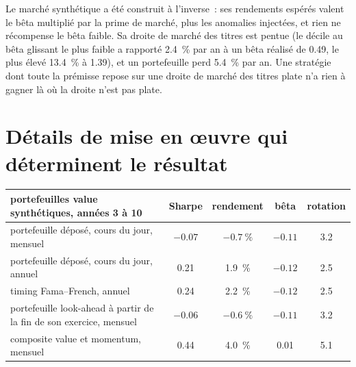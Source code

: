 Le marché synthétique a été construit à l'inverse~: ses rendements espérés valent le bêta multiplié par la prime de marché, plus les anomalies injectées, et rien ne récompense le bêta faible.
Sa droite de marché des titres est pentue (le décile au bêta glissant le plus faible a rapporté 2.4~\% par an à un bêta réalisé de 0.49, le plus élevé 13.4~\% à 1.39), et un
portefeuille  perd 5.4~\% par an. Une stratégie dont toute la prémisse repose sur une droite de marché des titres plate n'a rien à gagner là où la droite n'est pas plate.

\section{Détails de mise en œuvre qui déterminent le résultat}

\begin{center}
\small
\begin{tabular}{@{}lcccc@{}}
\toprule
portefeuilles value synthétiques, années 3 à 10 & Sharpe & rendement & bêta & rotation\\
\midrule
portefeuille déposé, cours du jour, mensuel & $-0.07$ & $-0.7~\%$ & $-0.11$ & 3.2\\
portefeuille déposé, cours du jour, annuel & 0.21 & 1.9~\% & $-0.12$ & 2.5\\
timing Fama--French, annuel & 0.24 & 2.2~\% & $-0.12$ & 2.5\\
portefeuille look-ahead à partir de la fin de son exercice, mensuel & $-0.06$ & $-0.6~\%$ & $-0.11$ & 3.2\\
composite value et momentum, mensuel & 0.44 & 4.0~\% & 0.01 & 5.1\\
\bottomrule
\end{tabular}
\end{center}

